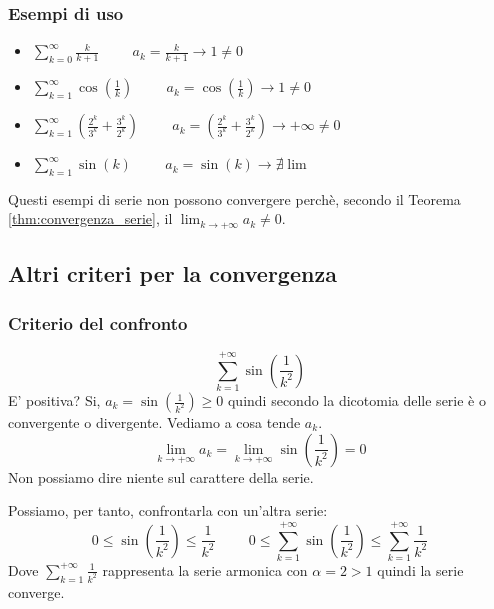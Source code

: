 \subsubsection{Esempi di uso}
\begin{itemize}
    \item $\sum^\infty_{k=0}\frac{k}{k+1}\hspace{1cm}a_k=\frac{k}{k+1}\to1\neq0$
    \item $\sum^\infty_{k=1}\cos(\frac{1}{k})\hspace{1cm}a_k=\cos(\frac{1}{k})\to1\neq0$
    \item $\sum^\infty_{k=1}(\frac{2^k}{3^k}+\frac{3^k}{2^k})\hspace{1cm}a_k=(\frac{2^k}{3^k}+\frac{3^k}{2^k})\to+\infty\neq0$
    \item $\sum^\infty_{k=1}\sin(k)\hspace{1cm}a_k=\sin(k)\to\nexists\lim$
\end{itemize}
Questi esempi di serie non possono convergere perchè, secondo il Teorema \ref{thm:convergenza_serie}, il $\lim_{k\to+\infty}a_k\neq0$.

\subsection*{Altri criteri per la convergenza}
\subsubsection{Criterio del confronto}
\begin{example}
    \begin{equation*}\sum^{+\infty}_{k=1}\sin(\frac{1}{k^2})\end{equation*}
    E' positiva? Si, $a_k=\sin(\frac{1}{k^2})\geq0$ quindi secondo la dicotomia delle serie è o convergente o divergente. Vediamo a cosa tende $a_k$. 
    \begin{equation*}\lim_{k\to+\infty}a_k=\lim_{k\to+\infty}\sin(\frac{1}{k^2})=0\end{equation*}
    Non possiamo dire niente sul carattere della serie.
    
    Possiamo, per tanto, confrontarla con un'altra serie:
    \begin{equation*}
        0\leq\sin(\frac{1}{k^2})\leq \frac{1}{k^2}\hspace{1cm}0\leq\sum^{+\infty}_{k=1}\sin(\frac{1}{k^2})\leq\sum^{+\infty}_{k=1}\frac{1}{k^2}
    \end{equation*}
    Dove $\sum^{+\infty}_{k=1}\frac{1}{k^2}$ rappresenta la serie armonica con $\alpha=2>1$ quindi la serie converge.
\end{example}

